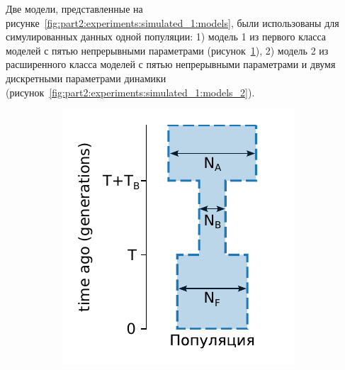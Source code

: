 Две модели, представленные на рисунке~\ref{fig:part2:experiments:simulated_1:models}, были использованы для симулированных данных одной популяции: 1) модель 1 из первого класса моделей с пятью непрерывными параметрами (рисунок~\ref{fig:part2:experiments:simulated_1:models_1}), 2) модель 2 из расширенного класса моделей с пятью непрерывными параметрами и двумя дискретными параметрами динамики (рисунок~\ref{fig:part2:experiments:simulated_1:models_2}).

\begin{figure}[ht]
    \centering
    \begin{subfigure}[b]{.33\textwidth}
    \includegraphics[width=\textwidth]{images_experiments/simulation_1/1pop/picture_1pop_model_1.pdf}
    \caption{}
    \label{fig:part2:experiments:simulated_1:models_1}
    \end{subfigure}%
    \begin{subfigure}[b]{.33\textwidth}

\end{subfigure}
\end{figure}
